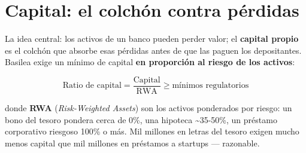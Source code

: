 \documentclass[
  spanish,
  letterpaper,
  DIV=11,
  numbers=noendperiod]{scrreprt}
\begin{document}
\section{Capital: el colchón contra
pérdidas}\label{capital-el-colchuxf3n-contra-puxe9rdidas}

La idea central: los activos de un banco pueden perder valor; el
\textbf{capital propio} es el colchón que absorbe esas pérdidas antes de
que las paguen los depositantes. Basilea exige un mínimo de capital
\textbf{en proporción al riesgo de los activos}:

\[\text{Ratio de capital} = \frac{\text{Capital}}{\text{RWA}} \geq \text{mínimos regulatorios}\]

donde \textbf{RWA} (\emph{Risk-Weighted Assets}) son los activos
ponderados por riesgo: un bono del tesoro pondera cerca de 0\%, una
hipoteca \textasciitilde35-50\%, un préstamo corporativo riesgoso 100\%
o más. Mil millones en letras del tesoro exigen mucho menos capital que
mil millones en préstamos a startups --- razonable.
\end{document}
